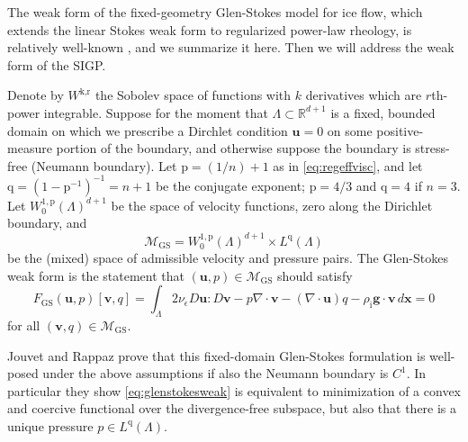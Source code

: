 \documentclass[letterpaper,final,12pt,reqno]{amsart}
\theoremstyle{claim}
\newcommand{\eps}{\epsilon}
\newcommand{\RR}{\mathbb{R}}
\newcommand{\Div}{\nabla\cdot}
\newcommand{\bg}{\mathbf{g}}
\newcommand{\bu}{\mathbf{u}}
\newcommand{\bv}{\mathbf{v}}
\newcommand{\bx}{\mathbf{x}}
\newcommand{\rhoi}{\rho_{\text{i}}}
\newcommand{\pp}{{\text{p}}}
\newcommand{\qq}{{\text{q}}}
\numberwithin{equation}{section}
\numberwithin{figure}{section}
\numberwithin{table}{section}
\numberwithin{theorem}{section}
\begin{document}
The weak form of the fixed-geometry Glen-Stokes model for ice flow, which extends the linear Stokes weak form \cite{Elmanetal2014} to regularized power-law rheology, is relatively well-known \cite{IsaacStadlerGhattas2015,JouvetRappaz2011,Lengetal2012}, and we summarize it here.  Then we will address the weak form of the SIGP.

Denote by $W^{\text{k},\text{r}}$ the Sobolev space \cite{Evans2010} of functions with $k$ derivatives which are $r$th-power integrable.  Suppose for the moment that $\Lambda \subset \RR^{d+1}$ is a fixed, bounded domain on which we prescribe a Dirchlet condition $\bu=0$ on some positive-measure portion of the boundary, and otherwise suppose the boundary is stress-free (Neumann boundary).  Let $\pp=(1/n)+1$ as in \eqref{eq:regeffvisc}, and let $\qq=(1-\pp^{-1})^{-1}=n+1$ be the conjugate exponent; $\pp=4/3$ and $\qq = 4$ if $n=3$.  Let $W_0^{1,\pp}(\Lambda)^{d+1}$ be the space of velocity functions, zero along the Dirichlet boundary, and
\begin{equation}
\mathcal{M}_{\text{GS}} = W_0^{1,\pp}(\Lambda)^{d+1} \times L^\qq(\Lambda)  \label{eq:mixed}
\end{equation}
be the (mixed) space of admissible velocity and pressure pairs.  The Glen-Stokes weak form is the statement that $(\bu,p) \in \mathcal{M}_{\text{GS}}$ should satisfy
\begin{equation}
F_{\text{GS}}(\bu,p)[\bv,q] = \int_\Lambda 2 \nu_\eps D\bu : D\bv - p \Div\bv - (\Div\bu) q - \rhoi \bg \cdot \bv\,d\bx = 0 \label{eq:glenstokesweak}
\end{equation}
for all $(\bv,q) \in \mathcal{M}_{\text{GS}}$.

Jouvet and Rappaz \cite{JouvetRappaz2011} prove that this fixed-domain Glen-Stokes formulation is well-posed under the above assumptions if also the Neumann boundary is $C^1$.  In particular they show \eqref{eq:glenstokesweak} is equivalent to minimization of a convex and coercive functional over the divergence-free subspace, but also that there is a unique pressure $p\in L^\qq(\Lambda)$.
\end{document}
